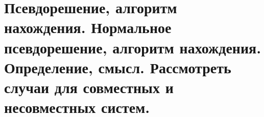 \section{
    Псевдорешение, алгоритм нахождения. Нормальное псевдорешение, алгоритм нахождения. Определение, смысл. Рассмотреть случаи для совместных и несовместных систем.
}




\newpage





\newpage



